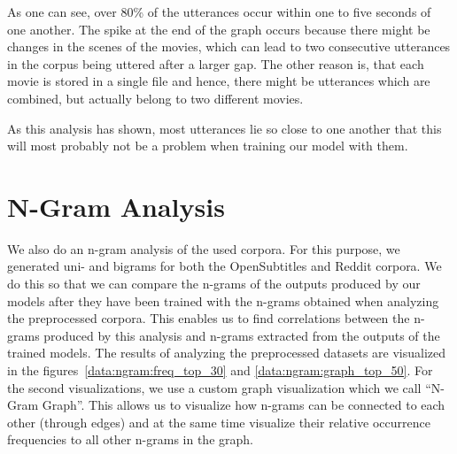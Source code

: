 As one can see, over 80\% of the utterances occur within one to five seconds of one another. The spike at the end of the graph occurs because there might be changes in the scenes of the movies, which can lead to two consecutive utterances in the corpus being uttered after a larger gap. The other reason is, that each movie is stored in a single file and hence, there might be utterances which are combined, but actually belong to two different movies.

As this analysis has shown, most utterances lie so close to one another that this will most probably not be a problem when training our model with them.

\section{N-Gram Analysis}
\label{chapter:data:ngram}
We also do an n-gram analysis of the used corpora. For this purpose, we generated uni- and bigrams for both the OpenSubtitles and Reddit corpora. We do this so that we can compare the n-grams of the outputs produced by our models after they have been trained with the n-grams obtained when analyzing the preprocessed corpora. This enables us to find correlations between the n-grams produced by this analysis and n-grams extracted from the outputs of the trained models. The results of analyzing the preprocessed datasets are visualized in the figures~\ref{data:ngram:freq_top_30} and \ref{data:ngram:graph_top_50}. For the second visualizations, we use a custom graph visualization which we call ``N-Gram Graph''. This allows us to visualize how n-grams can be connected to each other (through edges) and at the same time visualize their relative occurrence frequencies to all other n-grams in the graph.
 
